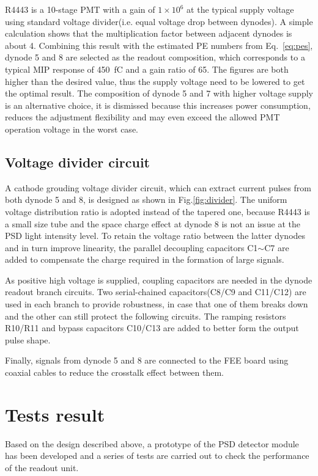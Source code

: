 \documentclass[5p, times]{elsarticle}
\begin{document}
R4443 is a 10-stage PMT with a gain of $1\times10^6$ at the typical supply voltage using standard voltage divider(i.e. equal voltage drop between dynodes).
A simple calculation shows that the multiplication factor between adjacent dynodes is about 4.
Combining this result with the estimated PE numbers from Eq.~\ref{eq:pes}, dynode 5 and 8 are selected as the readout composition, which corresponds to a typical MIP response of \SI{450}{\femto\coulomb} and a gain ratio of 65.
The figures are both higher than the desired value, thus the supply voltage need to be lowered to get the optimal result.
The composition of dynode 5 and 7 with higher voltage supply is an alternative choice, it is dismissed because this increases power consumption, reduces the adjustment flexibility and may even exceed the allowed PMT operation voltage in the worst case.

\subsection{Voltage divider circuit}
\label{sec:divider_design}
A cathode grouding voltage divider circuit, which can extract current pulses from both dynode 5 and 8, is designed as shown in Fig.\ref{fig:divider}.
The uniform voltage distribution ratio is adopted instead of the tapered one, because R4443 is a small size tube and the space charge effect at dynode 8 is not an issue at the PSD light intensity level.
To retain the voltage ratio between the latter dynodes and in turn improve linearity, the parallel decoupling capacitors C1$\sim$C7 are added to compensate the charge required in the formation of large signals.

As positive high voltage is supplied, coupling capacitors are needed in the dynode readout branch circuits.
Two serial-chained capacitors(C8/C9 and C11/C12) are used in each branch to provide robustness, in case that one of them breaks down and the other can still protect the following circuits.  
The ramping resistors R10/R11 and bypass capacitors C10/C13 are added to better form the output pulse shape.

Finally, signals from dynode 5 and 8 are connected to the FEE board using coaxial cables to reduce the crosstalk effect between them.

\section{Tests result}
\label{sec:result}
Based on the design described above, a prototype of the PSD detector module has been developed and a series of tests are carried out to check the performance of the readout unit.
\end{document}
